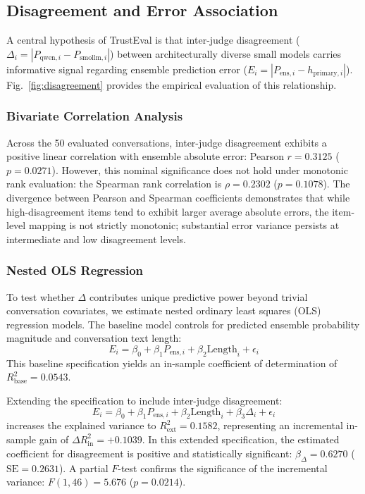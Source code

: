 \subsection{Disagreement and Error Association}
\label{subsec:disagreement_analysis}

A central hypothesis of TrustEval is that inter-judge disagreement ($\Delta_i = |P_{\text{qwen}, i} - P_{\text{smollm}, i}|$) between architecturally diverse small models carries informative signal regarding ensemble prediction error ($E_i = |P_{\text{ens}, i} - h_{\text{primary}, i}|$). Fig.~\ref{fig:disagreement} provides the empirical evaluation of this relationship.

\subsubsection{Bivariate Correlation Analysis}
Across the 50 evaluated conversations, inter-judge disagreement exhibits a positive linear correlation with ensemble absolute error: Pearson $r=0.3125$ ($p=0.0271$). However, this nominal significance does not hold under monotonic rank evaluation: the Spearman rank correlation is $\rho=0.2302$ ($p=0.1078$). The divergence between Pearson and Spearman coefficients demonstrates that while high-disagreement items tend to exhibit larger average absolute errors, the item-level mapping is not strictly monotonic; substantial error variance persists at intermediate and low disagreement levels.

\subsubsection{Nested OLS Regression}
To test whether $\Delta$ contributes unique predictive power beyond trivial conversation covariates, we estimate nested ordinary least squares (OLS) regression models. The baseline model controls for predicted ensemble probability magnitude and conversation text length:
\begin{equation}
    E_i = \beta_0 + \beta_1 P_{\text{ens}, i} + \beta_2 \text{Length}_i + \epsilon_i
\end{equation}
This baseline specification yields an in-sample coefficient of determination of $R^2_{\text{base}} = 0.0543$.

Extending the specification to include inter-judge disagreement:
\begin{equation}
    E_i = \beta_0 + \beta_1 P_{\text{ens}, i} + \beta_2 \text{Length}_i + \beta_3 \Delta_i + \epsilon_i
\end{equation}
increases the explained variance to $R^2_{\text{ext}} = 0.1582$, representing an incremental in-sample gain of $\Delta R^2_{\text{in}} = +0.1039$. In this extended specification, the estimated coefficient for disagreement is positive and statistically significant: $\hat{\beta}_{\Delta} = 0.6270$ ($\text{SE} = 0.2631$). A partial $F$-test confirms the significance of the incremental variance: $F(1, 46) = 5.676$ ($p = 0.0214$).

